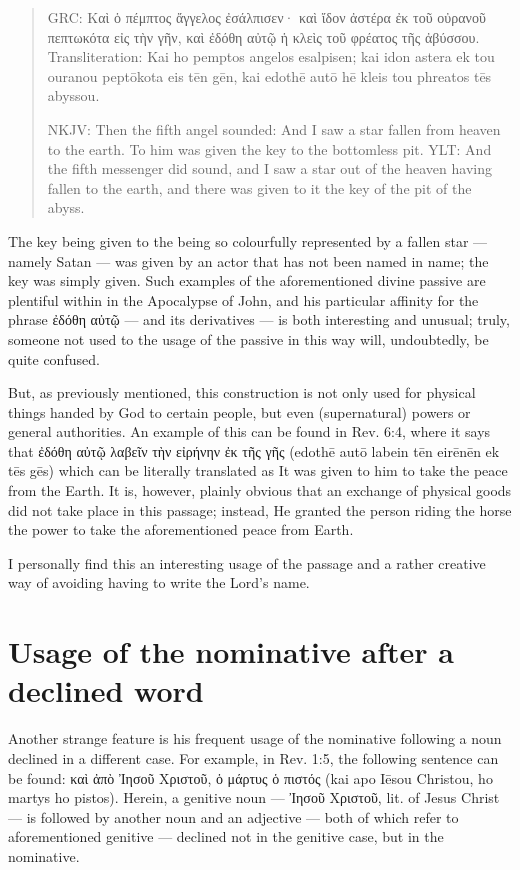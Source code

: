 \begin{quote}
GRC: Καὶ ὁ πέμπτος ἄγγελος ἐσάλπισεν· καὶ ἴδον ἀστέρα ἐκ τοῦ οὐρανοῦ πεπτωκότα εἰς τὴν γῆν, καὶ ἐδόθη αὐτῷ ἡ κλεὶς τοῦ φρέατος τῆς ἀβύσσου. 
Transliteration: Kai ho pemptos angelos esalpisen; kai idon astera ek tou ouranou peptōkota eis tēn gēn, kai edothē autō hē kleis tou phreatos tēs abyssou. 

NKJV: Then the fifth angel sounded: And I saw a star fallen from heaven to the earth. To him was given the key to the bottomless pit. 
YLT: And the fifth messenger did sound, and I saw a star out of the heaven having fallen to the earth, and there was given to it the key of the pit of the abyss.
\end{quote}

The key being given to the being so colourfully represented by a fallen star — namely Satan — was given by an actor that has not been named in name; the key was simply given. Such examples of the aforementioned divine passive are plentiful within in the Apocalypse of John, and his particular affinity for the phrase ἐδόθη αὐτῷ — and its derivatives — is both interesting and unusual; truly, someone not used to the usage of the passive in this way will, undoubtedly, be quite confused.

But, as previously mentioned, this construction is not only used for physical things handed by God to certain people, but even (supernatural) powers or general authorities. An example of this can be found in Rev. 6:4, where it says that ἐδόθη αὐτῷ λαβεῖν τὴν εἰρήνην ἐκ τῆς γῆς (edothē autō labein tēn eirēnēn ek tēs gēs) which can be literally translated as It was given to him to take the peace from the Earth. It is, however, plainly obvious that an exchange of physical goods did not take place in this passage; instead, He granted the person riding the horse the power to take the aforementioned peace from Earth.

I personally find this an interesting usage of the passage and a rather creative way of avoiding having to write the Lord’s name.

\section*{Usage of the nominative after a declined word}
  
 Another strange feature is his frequent usage of the nominative following a noun declined in a different case. For example, in Rev. 1:5, the following sentence can be found: καὶ ἀπὸ Ἰησοῦ Χριστοῦ, ὁ μάρτυς ὁ πιστός (kai apo Iēsou Christou, ho martys ho pistos). Herein, a genitive noun — Ἰησοῦ Χριστοῦ, lit. of Jesus Christ — is followed by another noun and an adjective — both of which refer to aforementioned genitive — declined not in the genitive case, but in the nominative.

